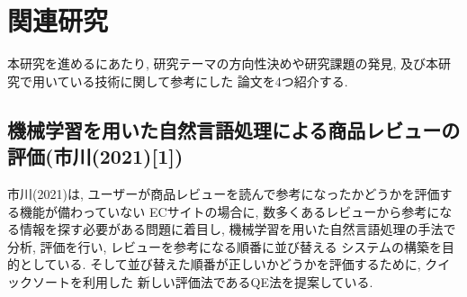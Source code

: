 \documentclass{ltjarticle}
\begin{document}
\newpage
\section{関連研究}
本研究を進めるにあたり, 研究テーマの方向性決めや研究課題の発見, 及び本研究で用いている技術に関して参考にした
論文を4つ紹介する. 
\subsection{機械学習を用いた自然言語処理による商品レビューの評価(市川(2021)[1])}
市川(2021)は, ユーザーが商品レビューを読んで参考になったかどうかを評価する機能が備わっていない
ECサイトの場合に, 数多くあるレビューから参考になる情報を探す必要がある問題に着目し, 
機械学習を用いた自然言語処理の手法で分析, 評価を行い, レビューを参考になる順番に並び替える
システムの構築を目的としている. そして並び替えた順番が正しいかどうかを評価するために, クイックソートを利用した
新しい評価法であるQE法を提案している. 
\end{document}
